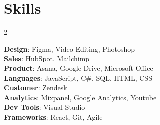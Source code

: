 \section{Skills}
\begin{multicols}{2}
  \begin{itemize}[leftmargin=0.20in, label={}]
    \small{
      \item{
        \textbf{Design}{: Figma, Video Editing, Photoshop} \\
        \textbf{Sales}{: HubSpot, Mailchimp} \\
        \textbf{Product}{: Asana, Google Drive, Microsoft Office} \\
        \textbf{Languages}{: JavaScript, C\#, SQL, HTML, CSS} \\
        \textbf{Customer}{: Zendesk} \\
        \textbf{Analytics}{: Mixpanel, Google Analytics, Youtube} \\
        \textbf{Dev Tools}{: Visual Studio} \\
        \textbf{Frameworks}{: React, Git, Agile} \\
      }
    }
  \end{itemize}
  \end{multicols}